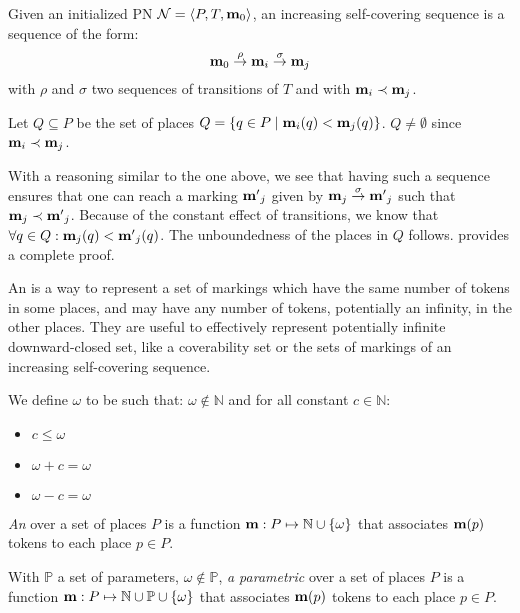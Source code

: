 \begin{defi}
  Given an initialized \ac{PN} $\mathcal{N} = \langle P,T, \mathbf{m}_0\rangle$,
  an increasing self-covering sequence is a sequence of the form:
  \[
    \mathbf{m}_0 \stackrel{\rho}{\to} \mathbf{m}_i \stackrel{\sigma}{\to} \mathbf{m}_j
  \]
  with $\rho$ and $\sigma$ two sequences of transitions of $T$
  and with $\mathbf{m}_i \prec \mathbf{m}_j$.
\end{defi}

Let $Q \subseteq P$ be the set of places $Q = \{q \in P \mid \mathbf{m}_i(q) < \mathbf{m}_j(q)\}$.
$Q \neq \emptyset$ since $\mathbf{m}_i \prec \mathbf{m}_j$.

With a reasoning similar to the one above, we see that having such a sequence ensures that one can reach a marking $\mathbf{m'}_j$ given by $\mathbf{m}_j \stackrel{\sigma}{\to} \mathbf{m'}_j$ such that $\mathbf{m}_j \prec \mathbf{m'}_j$.
Because of the constant effect of transitions, we know that $\forall q \in Q : \mathbf{m}_j(q) < \mathbf{m'}_j(q)$.
The unboundedness of the places in $Q$ follows.
\cite{David17} provides a complete proof.

An \omark is a way to represent a set of markings which have the same number of tokens in some places, and may have any number of tokens, potentially an infinity, in the other places.
They are useful to effectively represent potentially infinite downward-closed set, like a coverability set or the sets of markings of an increasing self-covering sequence.

\begin{defi}[\omark]
  We define $\omega$ to be such that:
  $\omega \notin \mathbb{N}$
  and for all constant $c \in \mathbb{N}$:
  \begin{itemize}
    \item $c \leq \omega$
    \item $\omega + c = \omega$
    \item $\omega - c = \omega$
  \end{itemize}

  \emph{An \omark} \mar over a set of places $P$ is a function $\mathbf{m} : P \mapsto \mathbb{N} \cup \{\omega\}$ that associates $\mathbf{m}(p)$ tokens to each place $p \in P$.

  With $\mathbb{P}$ a set of parameters, $\omega \notin \mathbb{P}$,
  \emph{a parametric \omark} \mar over a set of places $P$ is a function $\mathbf{m} : P \mapsto \mathbb{N} \cup \mathbb{P} \cup \{\omega\}$ that associates $\mathbf{m}(p)$ tokens to each place $p \in P$.
\end{defi}


